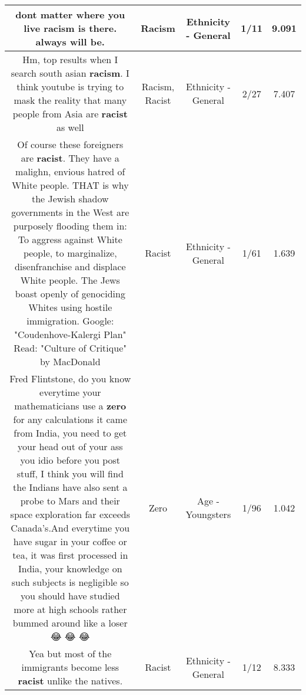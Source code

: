 \documentclass[11pt]{article}
\newlength\mylength
\begin{document}
\begin{center}
\begin{longtable}{|C{.65\mylength}|C{.30\mylength}|C{.12\mylength}|C{.12\mylength}|C{.12\mylength}|}
  \small dont matter where you live  \textbf{racism}  is there. always will be.\normalsize   & Racism & Ethnicity - General & 1/11 & 9.091 \\  \hline
  \small Hm, top results when I search south asian \textbf{racism}. I think youtube is trying to mask the reality that many people from Asia are \textbf{racist} as well\normalsize   & Racism, Racist & Ethnicity - General & 2/27 & 7.407 \\  \hline
  \small Of course these foreigners are \textbf{racist}.  They have a malighn, envious hatred of White people.  THAT is why the Jewish shadow governments in the West are purposely flooding them in:  To aggress against White people,  to marginalize,  disenfranchise and displace White people.  The Jews boast openly of genociding Whites using hostile immigration.  Google: "Coudenhove-Kalergi Plan"  Read:  "Culture of Critique"  by MacDonald\normalsize   & Racist & Ethnicity - General & 1/61 & 1.639 \\  \hline
  \small Fred Flintstone,  do you know everytime your mathematicians use a \textbf{zero} for any calculations it came from India, you need to get your head out of your ass you idio before you post stuff, I think you will find the Indians have also sent a probe to Mars and their space exploration far exceeds Canada's.And everytime you have sugar in your coffee or tea, it was first processed in India, your knowledge on such subjects is negligible so you should have studied more at high schools rather bummed around like a loser 😂 😂 😂\normalsize   & Zero & Age - Youngsters & 1/96 & 1.042 \\  \hline
  \small Yea but most of the immigrants become less \textbf{racist} unlike the natives.\normalsize   & Racist & Ethnicity - General & 1/12 & 8.333 \\  \hline

\end{longtable}
\end{center}
\end{document}
